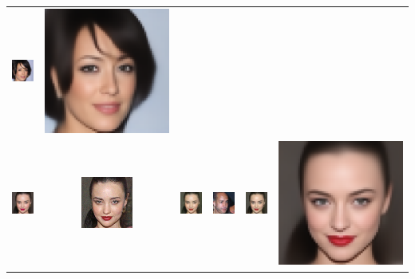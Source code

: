 \begin{table}[h!]
{\begin{tabular}{cccccc}
        \includegraphics[width=.145\textwidth]{chapter4/figures/images/celebA/diffusion_decoder_beta_0/6.png} &
        \includegraphics[width=.145\textwidth]{chapter4/figures/images/celebA/VAE_reconstruction/6.png} \\
        \includegraphics[width=.145\textwidth]{chapter4/figures/images/celebA/original/7.png} &   
        \includegraphics[width=.145\textwidth]{chapter4/figures/images/celebA/reconstruction/7.png} &
        \includegraphics[width=.145\textwidth]{chapter4/figures/images/celebA/corrected_reconstruction/7.png} &
        \includegraphics[width=.145\textwidth]{chapter4/figures/images/celebA/diffusion_decoder_beta_0.01/7.png} &
        \includegraphics[width=.145\textwidth]{chapter4/figures/images/celebA/diffusion_decoder_beta_0/7.png} &
        \includegraphics[width=.145\textwidth]{chapter4/figures/images/celebA/VAE_reconstruction/7.png} \\

\end{tabular}}
\end{table}

